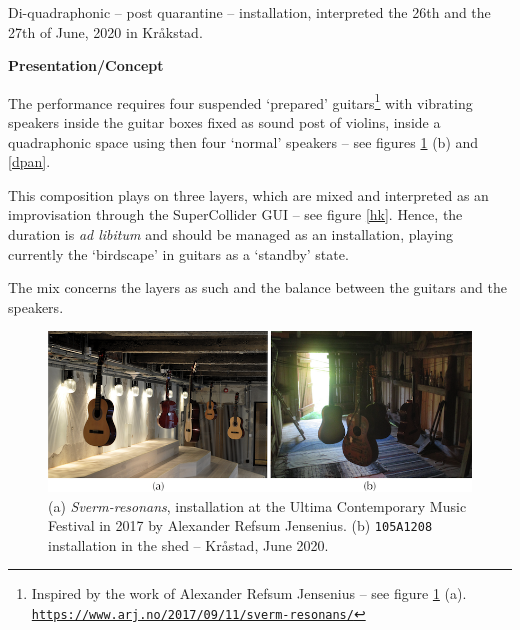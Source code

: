 Di-quadraphonic -- post quarantine -- installation, interpreted the 26th and the 27th of June, 2020 in Kr\aa kstad.

\bigskip

\noindent \textbf{{\large Presentation/Concept}}
\hrulefill

\bigskip

The performance requires four suspended `prepared' guitars\footnote{Inspired by the work of Alexander Refsum Jensenius -- see figure \ref{arj} (a). \\ \href{https://www.arj.no/2017/09/11/sverm-resonans/}{\scriptsize{\texttt{https://www.arj.no/2017/09/11/sverm-resonans/}}}
} with vibrating speakers inside the guitar boxes fixed as sound post of violins, inside a quadraphonic space using then four `normal' speakers -- see figures \ref{arj} (b) and \ref{dpan}.

This composition plays on three layers, which are mixed and interpreted as an improvisation through the SuperCollider GUI -- see figure \ref{hk}. Hence, the duration is \textit{ad libitum} and should be managed as an installation, playing currently the `birdscape' in guitars as a `standby' state. 

The mix concerns the layers as such and the balance between the guitars and the speakers.

 \begin{figure}[hbt]
\begin{center}
	\includegraphics[width=\textwidth]{img/6757}		
\caption{(a) \textit{Sverm-resonans}, installation at the Ultima Contemporary Music Festival in 2017 by Alexander Refsum Jensenius. (b) \texttt{105A1208} installation in the shed -- Kr\aa stad, June 2020.}
\label{arj}
\end{center}
\end{figure}

